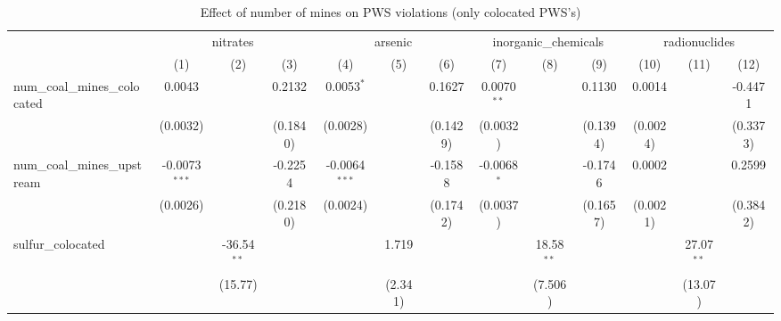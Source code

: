 
\begin{table}[htbp]
   \caption{\label{olsrf2sls_nummine_mine_vio_binary_1985to2005colocate} Effect of number of mines on PWS violations (only colocated PWS's)}
   \bigskip
   \centering
   \begin{adjustbox}{width = \textwidth, center}
      \begin{tabular}{lcccccccccccc}
         \toprule
          & \multicolumn{3}{c}{nitrates} & \multicolumn{3}{c}{arsenic} & \multicolumn{3}{c}{inorganic\_chemicals} & \multicolumn{3}{c}{radionuclides}\\
                                                            & (1)             & (2)           & (3)           & (4)             & (5)           & (6)           & (7)           & (8)           & (9)           & (10)                  & (11)          & (12)\\  
         \midrule 
         num\_coal\_mines\_colocated                        & 0.0043          &               & 0.2132        & 0.0053$^{*}$    &               & 0.1627        & 0.0070$^{**}$ &               & 0.1130        & 0.0014                &               & -0.4471\\   
                                                            & (0.0032)        &               & (0.1840)      & (0.0028)        &               & (0.1429)      & (0.0032)      &               & (0.1394)      & (0.0024)              &               & (0.3373)\\   
         num\_coal\_mines\_upstream                         & -0.0073$^{***}$ &               & -0.2254       & -0.0064$^{***}$ &               & -0.1588       & -0.0068$^{*}$ &               & -0.1746       & 0.0002                &               & 0.2599\\   
                                                            & (0.0026)        &               & (0.2180)      & (0.0024)        &               & (0.1742)      & (0.0037)      &               & (0.1657)      & (0.0021)              &               & (0.3842)\\   
         sulfur\_colocated                                  &                 & -36.54$^{**}$ &               &                 & 1.719         &               &               & 18.58$^{**}$  &               &                       & 27.07$^{**}$  &   \\   
                                                            &                 & (15.77)       &               &                 & (2.341)       &               &               & (7.506)       &               &                       & (13.07)       &   \\   

\end{tabular}
\end{adjustbox}
\end{table}
